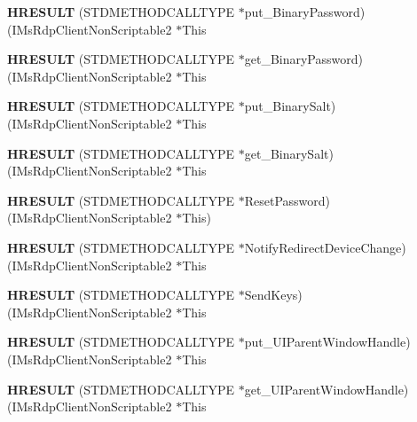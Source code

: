 \begin{DoxyCompactItemize}
{\bfseries H\+R\+E\+S\+U\+LT} (S\+T\+D\+M\+E\+T\+H\+O\+D\+C\+A\+L\+L\+T\+Y\+PE $\ast$put\+\_\+\+Binary\+Password)(I\+Ms\+Rdp\+Client\+Non\+Scriptable2 $\ast$This
\item 
\mbox{\label{struct_i_ms_rdp_client_non_scriptable2_vtbl_a1515b450fc141b4a19cb3d549a60c8d4}} 
{\bfseries H\+R\+E\+S\+U\+LT} (S\+T\+D\+M\+E\+T\+H\+O\+D\+C\+A\+L\+L\+T\+Y\+PE $\ast$get\+\_\+\+Binary\+Password)(I\+Ms\+Rdp\+Client\+Non\+Scriptable2 $\ast$This
\item 
\mbox{\label{struct_i_ms_rdp_client_non_scriptable2_vtbl_a8d28a417baf513213c4d5d5e3f5495aa}} 
{\bfseries H\+R\+E\+S\+U\+LT} (S\+T\+D\+M\+E\+T\+H\+O\+D\+C\+A\+L\+L\+T\+Y\+PE $\ast$put\+\_\+\+Binary\+Salt)(I\+Ms\+Rdp\+Client\+Non\+Scriptable2 $\ast$This
\item 
\mbox{\label{struct_i_ms_rdp_client_non_scriptable2_vtbl_a0a56d2b45606b137ef927b12a217a95a}} 
{\bfseries H\+R\+E\+S\+U\+LT} (S\+T\+D\+M\+E\+T\+H\+O\+D\+C\+A\+L\+L\+T\+Y\+PE $\ast$get\+\_\+\+Binary\+Salt)(I\+Ms\+Rdp\+Client\+Non\+Scriptable2 $\ast$This
\item 
\mbox{\label{struct_i_ms_rdp_client_non_scriptable2_vtbl_a65f5417a08207d601c2c899c22b4eddc}} 
{\bfseries H\+R\+E\+S\+U\+LT} (S\+T\+D\+M\+E\+T\+H\+O\+D\+C\+A\+L\+L\+T\+Y\+PE $\ast$Reset\+Password)(I\+Ms\+Rdp\+Client\+Non\+Scriptable2 $\ast$This)
\item 
\mbox{\label{struct_i_ms_rdp_client_non_scriptable2_vtbl_afff02b852de8afd2fc42208edb3ecb57}} 
{\bfseries H\+R\+E\+S\+U\+LT} (S\+T\+D\+M\+E\+T\+H\+O\+D\+C\+A\+L\+L\+T\+Y\+PE $\ast$Notify\+Redirect\+Device\+Change)(I\+Ms\+Rdp\+Client\+Non\+Scriptable2 $\ast$This
\item 
\mbox{\label{struct_i_ms_rdp_client_non_scriptable2_vtbl_a77ef48ae29f5a466c41530c83feb927f}} 
{\bfseries H\+R\+E\+S\+U\+LT} (S\+T\+D\+M\+E\+T\+H\+O\+D\+C\+A\+L\+L\+T\+Y\+PE $\ast$Send\+Keys)(I\+Ms\+Rdp\+Client\+Non\+Scriptable2 $\ast$This
\item 
\mbox{\label{struct_i_ms_rdp_client_non_scriptable2_vtbl_a0bedc3faf8c8b039f8fc56b8c84684eb}} 
{\bfseries H\+R\+E\+S\+U\+LT} (S\+T\+D\+M\+E\+T\+H\+O\+D\+C\+A\+L\+L\+T\+Y\+PE $\ast$put\+\_\+\+U\+I\+Parent\+Window\+Handle)(I\+Ms\+Rdp\+Client\+Non\+Scriptable2 $\ast$This
\item 
\mbox{\label{struct_i_ms_rdp_client_non_scriptable2_vtbl_a8980c995662cffba217b25a7fe6bd908}} 
{\bfseries H\+R\+E\+S\+U\+LT} (S\+T\+D\+M\+E\+T\+H\+O\+D\+C\+A\+L\+L\+T\+Y\+PE $\ast$get\+\_\+\+U\+I\+Parent\+Window\+Handle)(I\+Ms\+Rdp\+Client\+Non\+Scriptable2 $\ast$This
\end{DoxyCompactItemize}
